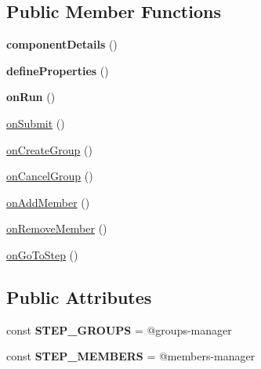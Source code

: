 \subsection*{Public Member Functions}
\begin{DoxyCompactItemize}
\item 
\hypertarget{classDMA_1_1Friends_1_1Components_1_1GroupManager_a060db8751d55b0068666951f864263b3}{}{\bfseries component\+Details} ()\label{classDMA_1_1Friends_1_1Components_1_1GroupManager_a060db8751d55b0068666951f864263b3}

\item 
\hypertarget{classDMA_1_1Friends_1_1Components_1_1GroupManager_a4837e1df34761838844262791e1c1d6b}{}{\bfseries define\+Properties} ()\label{classDMA_1_1Friends_1_1Components_1_1GroupManager_a4837e1df34761838844262791e1c1d6b}

\item 
\hypertarget{classDMA_1_1Friends_1_1Components_1_1GroupManager_ad956ddad7b4f23cfc2111bbe97d40c77}{}{\bfseries on\+Run} ()\label{classDMA_1_1Friends_1_1Components_1_1GroupManager_ad956ddad7b4f23cfc2111bbe97d40c77}

\item 
\hyperlink{classDMA_1_1Friends_1_1Components_1_1GroupManager_ab676c63165e8a5ac01b8c7e6630f187f}{on\+Submit} ()
\item 
\hyperlink{classDMA_1_1Friends_1_1Components_1_1GroupManager_a1022b6c4b9d4a31cf1b41d15ba13ab1f}{on\+Create\+Group} ()
\item 
\hyperlink{classDMA_1_1Friends_1_1Components_1_1GroupManager_a7cec31625dfe221d62d620a078883815}{on\+Cancel\+Group} ()
\item 
\hyperlink{classDMA_1_1Friends_1_1Components_1_1GroupManager_ac0784d39e4fe94f792bec571cec1b202}{on\+Add\+Member} ()
\item 
\hyperlink{classDMA_1_1Friends_1_1Components_1_1GroupManager_a66ab56b50c4bc943aad47bc5fdd33789}{on\+Remove\+Member} ()
\item 
\hyperlink{classDMA_1_1Friends_1_1Components_1_1GroupManager_a852933111a787d927fc27d3f9465cd07}{on\+Go\+To\+Step} ()
\end{DoxyCompactItemize}
\subsection*{Public Attributes}
\begin{DoxyCompactItemize}
\item 
\hypertarget{classDMA_1_1Friends_1_1Components_1_1GroupManager_a0f7f7beaddfc56dc358a16414e86c81c}{}const {\bfseries S\+T\+E\+P\+\_\+\+G\+R\+O\+U\+P\+S} = \textquotesingle{}@groups-\/manager\textquotesingle{}\label{classDMA_1_1Friends_1_1Components_1_1GroupManager_a0f7f7beaddfc56dc358a16414e86c81c}

\item 
\hypertarget{classDMA_1_1Friends_1_1Components_1_1GroupManager_af8042daa037d008291e60d95f037707f}{}const {\bfseries S\+T\+E\+P\+\_\+\+M\+E\+M\+B\+E\+R\+S} = \textquotesingle{}@members-\/manager\textquotesingle{}\label{classDMA_1_1Friends_1_1Components_1_1GroupManager_af8042daa037d008291e60d95f037707f}

\end{DoxyCompactItemize}
